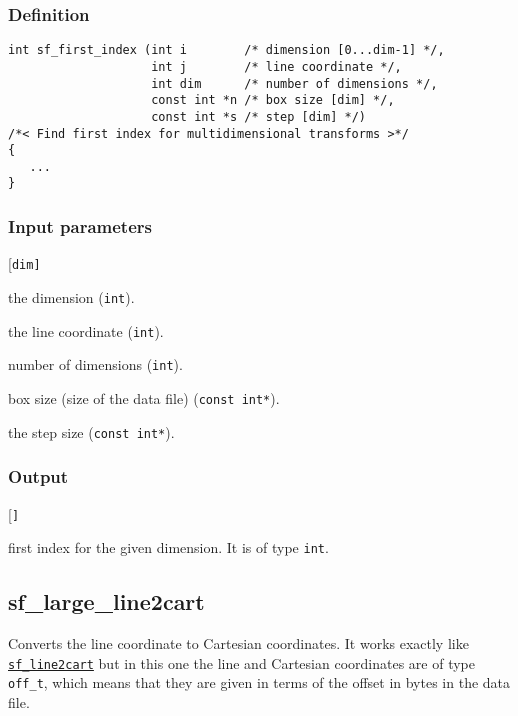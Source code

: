 \subsubsection*{Definition}
\begin{verbatim}
int sf_first_index (int i        /* dimension [0...dim-1] */, 
                    int j        /* line coordinate */, 
                    int dim      /* number of dimensions */, 
                    const int *n /* box size [dim] */, 
                    const int *s /* step [dim] */)
/*< Find first index for multidimensional transforms >*/
{
   ... 
}
\end{verbatim}


\subsubsection*{Input parameters}
\begin{desclist}{\tt }{\quad}[\tt dim]
   \setlength\itemsep{0pt}
   \item[i]   the dimension (\texttt{int}).  
   \item[j]   the line coordinate (\texttt{int}).  
   \item[dim] number of dimensions (\texttt{int}).  
   \item[n]   box size (size of the data file) (\texttt{const int*}).  
   \item[s]   the step size (\texttt{const int*}).  
\end{desclist}

\subsubsection*{Output}
\begin{desclist}{\tt }{\quad}[\tt ]
   \setlength\itemsep{0pt}
   \item[i0] first index for the given dimension. It is of type \texttt{int}.
\end{desclist}




\subsection{{sf\_large\_line2cart}}
Converts the line coordinate to Cartesian coordinates. It works exactly like \hyperref[sec:sf_line2cart]{\texttt{sf\_line2cart}} but in this one the line and Cartesian coordinates are of type \texttt{off\_t}, which means that they are given in terms of the offset in bytes in the data file.

